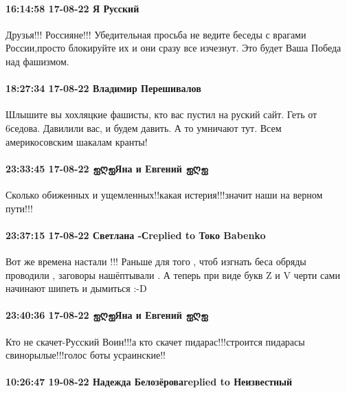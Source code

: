  
 
 
 
 

\paragraph{16:14:58 17-08-22 Я Русский}

Друзья!!! Россияне!!! Убедительная просьба не ведите беседы с врагами
России,просто блокируйте их и они сразу все изчезнут. Это будет Ваша Победа над
фашизмом.

\paragraph{18:27:34 17-08-22 Владимир Перешивалов}

Шлышите вы хохляцкие фашисты, кто вас пустил на руский сайт. Геть от 6седова.
Давилили вас, и будем давить. А то умничают тут. Всем америкосовским шакалам
кранты!

\paragraph{23:33:45 17-08-22 ஐღஐЯна и Евгений ஐღஐ}

Сколько обиженных и ущемленных!!какая истерия!!!значит наши на верном пути!!!

\paragraph{23:37:15 17-08-22 Светлана -Сreplied to Токо Babenko}

Вот же времена настали !!! Раньше для того , чтоб изгнать беса обряды проводили
, заговоры нашёптывали . А теперь при виде букв Z и V черти сами начинают
шипеть и дымиться :-D

\paragraph{23:40:36 17-08-22 ஐღஐЯна и Евгений ஐღஐ}

Кто не скачет-Русский Воин!!!а кто скачет пидарас!!!строится пидарасы
свинорылые!!!голос боты усраинские!!

\paragraph{10:26:47 19-08-22 Надежда Белозёроваreplied to Неизвестный}

